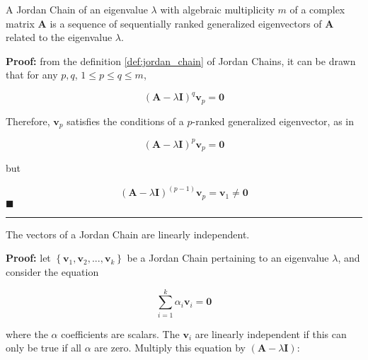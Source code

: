 \begin{theorem} \label{theo:jordan_chains_def2} %
	A Jordan Chain of an eigenvalue $\lambda$ with algebraic multiplicity $m$ of a complex matrix $\mathbf{A}$ is a sequence of sequentially ranked generalized eigenvectors of $\mathbf{A}$ related to the eigenvalue $\lambda$.
\end{theorem}
\textbf{Proof:} from the definition \ref{def:jordan_chain} of Jordan Chains, it can be drawn that for any $p,q$, $1 \leq p \leq q \leq m$, 

\begin{equation} \left(\mathbf{A} - \lambda\mathbf{I}\right)^q \mathbf{v}_{p} = \mathbf{0} \end{equation}

	Therefore, $\mathbf{v}_p$ satisfies the conditions of a $p$-ranked generalized eigenvector, as in

\begin{equation} \left(\mathbf{A} - \lambda\mathbf{I}\right)^p \mathbf{v}_{p} = \mathbf{0} \end{equation}

	but

\begin{equation} \left(\mathbf{A} - \lambda\mathbf{I}\right)^{(p-1)}\mathbf{v}_{p} = \mathbf{v}_1 \neq \mathbf{0} \end{equation}
\hfill$\blacksquare$

\vspace{5mm}
\hrule
\vspace{5mm} %

\begin{theorem} \label{theo:jordan_chain_li} %
	The vectors of a Jordan Chain are linearly independent.
\end{theorem}
\textbf{Proof:} let $\left\{\mathbf{v}_1,\mathbf{v}_2,...,\mathbf{v}_k\right\}$ be a Jordan Chain pertaining to an eigenvalue $\lambda$, and consider the equation

\begin{equation} \sum\limits_{i=1}^{k} \alpha_i \mathbf{v}_i = \mathbf{0} \label{eq:theo_jordan_chain_li_original} \end{equation}

	where the $\alpha$ coefficients are scalars. The $\mathbf{v}_i$ are linearly independent if this can only be true if all $\alpha$ are zero. Multiply this equation by $\left(\mathbf{A} - \lambda\mathbf{I}\right)$:

